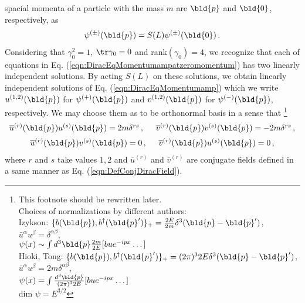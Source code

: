 spacial momenta of a particle with the mass $m$ are
$\bld{p}$ and $\bld{0}$, respectively,
as
\begin{eqnarray}
\psi^{(\pm)}(\bld{p}) = S(L) \psi^{(\pm)}(\bld{0}) \,.
\end{eqnarray}
Considering that $\gamma_0^2 =1$, $\tr \gamma_0 = 0$ and rank$(\gamma_0) = 4$,
we recognize that each of equations in Eq. (\ref{eqn:DiracEqMomentumampatzeromomentum})
has  two  linearly independent solutions.
By acting $S(L)$ on 
these solutions, we obtain linearly independent solutions of Eq. (\ref{eqn:DiracEqMomentumamp})
which we write $u^{(1, 2)}(\bld{p})$ for $\psi^{(+)}(\bld{p})$ and $v^{(1,2)}(\bld{p})$
 for $\psi^{(-)}(\bld{p})$, respectively. 
We may choose them as to be orthonormal basis in a sense that
\footnote{%
This footnote should be rewritten later.\\
Choices of normalizations by different authors:\\
Izykson: $\{ b(\bld{p}),b^\dagger(\bld{p}') \}_+ = \frac{2E}{2m}\delta^3(\bld{p}-\bld{p}')$,
$\bar{u}^\alpha u^\beta = \delta^{\alpha \beta}$,\\
\hspace{20mm}$\psi(x) \sim \int d^3\bld{p}\frac{2m}{2E}[ b u e^{-ipx} \dots]$\\
Hioki, Tong: $\{ b(\bld{p}),b^\dagger(\bld{p}') \}_+ = (2\pi)^3 2E\delta^3(\bld{p}-\bld{p}')$,
$\bar{u}^\alpha u^\beta = 2m \delta^{\alpha \beta}$,\\
\hspace{20mm}$\psi(x) = \int \frac{d^3\bld{p}}{(2\pi)^32E}[ b u e^{-ipx} \dots]$\\
dim $\psi = E^{3/2}$
}%
\begin{eqnarray}
\begin{array}{c}
\overline{u}^{(r)}(\bld{p})
u^{(s)}(\bld{p})
= 2m \delta^{rs}\,,
\hspace{5mm}
\overline{v}^{(r)}(\bld{p})
v^{(s)}(\bld{p})
= -2m \delta^{rs}\,,
\vspace{2mm}
\\
\overline{u}^{(r)}(\bld{p})
v^{(s)}(\bld{p})
= 0\,,
\hspace{5mm}
\overline{v}^{(r)}(\bld{p})
u^{(s)}(\bld{p})
= 0 \,,
\end{array}
\label{eqn:DiracspinorNormalization}
\end{eqnarray}
where $r$ and $s$ take values $1, 2$ and
$\overline{u}^{(r)}$  and $\overline{v}^{(r)}$ 
are conjugate fields defined in a same manner as Eq. (\ref{eqn:DefConjDiracField}).
